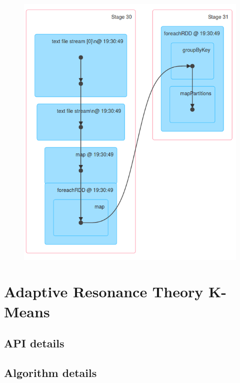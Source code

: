 \documentclass{l4proj}
\begin{document}
\begin{figure}[H]
\begin{minipage}{.45\textwidth}
  \label{fig:dag5}
\end{minipage}%
\begin{minipage}{.55\textwidth}
  \centering
  \includegraphics[width=1.1\linewidth]{images/DAG6}
  \label{fig:dag6}
\end{minipage}
\end{figure}


\chapter{Adaptive Resonance Theory K-Means}
\label{art}

\section{API details}

\section{Algorithm details}
\end{document}
